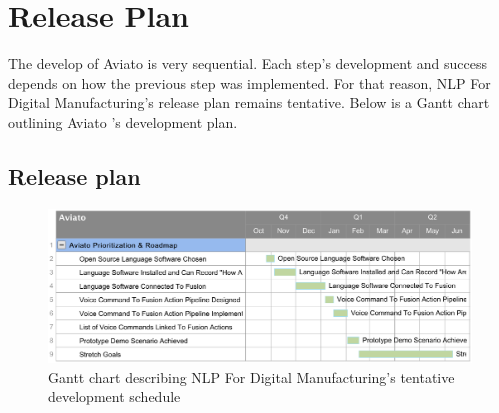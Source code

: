 \documentclass[onecolumn, draftclsnofoot,10pt, compsoc]{IEEEtran}
\def \CapstoneProjectName{NLP For Digital Manufacturing}
\def \botname{Aviato }
\begin{document}
\section{Release Plan}
	The develop of \botname is very sequential. Each step's development and success depends on how the previous step was implemented. For that reason, \CapstoneProjectName's release plan remains tentative. Below is a Gantt chart outlining \botname's development plan.
    \subsection{Release plan}
    	\begin{figure}[H]
    		\includegraphics[width=1\textwidth]{ganttChart.eps}
    		\centering
    		\caption{Gantt chart describing \CapstoneProjectName's tentative development schedule}
   			\label{fig:mesh1}
    	\end{figure}


% 
%
\end{document}
